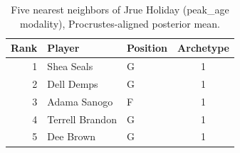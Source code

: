\begin{table}[htbp]
  \centering\small
  \begin{tabular}{rllc}
    \toprule
    Rank & Player & Position & Archetype \\
    \midrule
    1 & Shea Seals & G & 1 \\
    2 & Dell Demps & G & 1 \\
    3 & Adama Sanogo & F & 1 \\
    4 & Terrell Brandon & G & 1 \\
    5 & Dee Brown & G & 1 \\
    \bottomrule
  \end{tabular}
  \caption{Five nearest neighbors of Jrue Holiday (peak_age modality), Procrustes-aligned posterior mean.}
  \label{tab:Jrue_Holiday_neighbors_peak_age}
\end{table}

